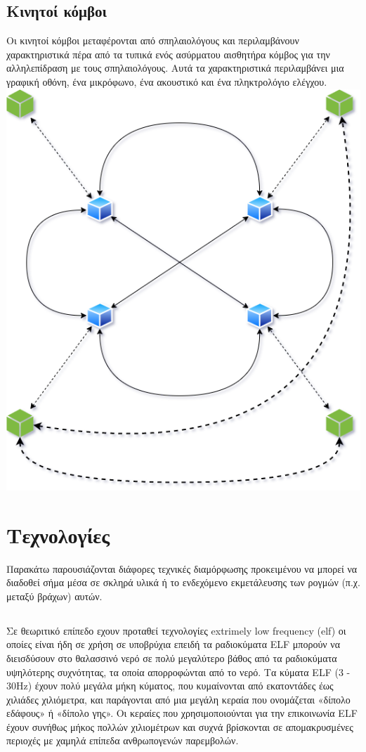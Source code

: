 \documentclass[12pt]{article}
\begin{document}
\begin{multicols}{2}
    \subsection{\small \textsf{Κινητοί κόμβοι}}
        Οι κινητοί κόμβοι μεταφέρονται από σπηλαιολόγους και περιλαμβάνουν
        χαρακτηριστικά πέρα από τα τυπικά ενός ασύρματου αισθητήρα
        κόμβος για την αλληλεπίδραση με τους σπηλαιολόγους. Αυτά τα χαρακτηριστικά
        περιλαμβάνει μια γραφική οθόνη, ένα μικρόφωνο, ένα ακουστικό
        και ένα πληκτρολόγιο ελέγχου.
        \includegraphics*[scale=.4]{img/ICWMSN-WMSNpng.png}

    \section{\normalsize  \textsf{Τεχνολογίες}}
    Παρακάτω παρουσιάζονται διάφορες τεχνικές διαμόρφωσης προκειμένου να μπορεί να διαδοθεί σήμα μέσα σε σκληρά υλικά ή το ενδεχόμενο εκμετάλευσης των ρογμών (π.χ. μεταξύ βράχων) αυτών.

    \subsection{} Σε θεωριτικό επίπεδο εχουν προταθεί τεχνολογίες extrimely low frequency (elf) οι οποίες είναι ήδη σε χρήση σε υποβρύχια επειδή τα ραδιοκύματα ELF μπορούν να διεισδύσουν στο θαλασσινό νερό σε πολύ μεγαλύτερο βάθος από τα ραδιοκύματα υψηλότερης συχνότητας, τα οποία απορροφώνται από το νερό. Τα κύματα ELF (3 - 30Hz) έχουν πολύ μεγάλα μήκη κύματος, που κυμαίνονται από εκατοντάδες έως χιλιάδες χιλιόμετρα, και παράγονται από μια μεγάλη κεραία που ονομάζεται «δίπολο εδάφους» ή «δίπολο γης». Οι κεραίες που χρησιμοποιούνται για την επικοινωνία ELF έχουν συνήθως μήκος πολλών χιλιομέτρων και συχνά βρίσκονται σε απομακρυσμένες περιοχές με χαμηλά επίπεδα ανθρωπογενών παρεμβολών.


\end{multicols}
\end{document}
